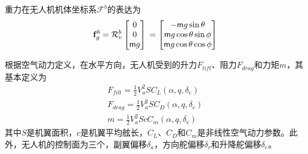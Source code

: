 重力在无人机机体坐标系$\mathcal{F}^b$的表达为
\begin{equation}
	\mathbf{f}_g^b =\mathcal{R}^b_v \begin{bmatrix}0  \\ 0  \\ \mathsf{m}g  \end{bmatrix} \\
	= \begin{bmatrix} -\mathsf{m} g \sin \theta  \\ \mathsf{m}g \cos \theta \sin \phi  \\ \mathsf{m}g \cos\theta \cos \phi  \end{bmatrix}
\end{equation}

根据空气动力定义，在水平方向，无人机受到的升力$F_{lift}$、阻力$F_{drag}$和力矩$m$，其基本定义为
\begin{align}
	F_{filt} = \frac{1}{2} V_a^2SC_L(\alpha, q, \delta_e) \\
	F_{drag} = \frac{1}{2} V_a^2SC_D(\alpha, q, \delta_e) \\
	m = \frac{1}{2} V_a^2ScC_m(\alpha, q, \delta_e)
\end{align}
其中$S$是机翼面积，$c$是机翼平均舷长，$C_L$、$C_D$和$C_m$是非线性空气动力参数。此外，无人机的控制面为三个，副翼偏移$\delta_a$，方向舵偏移$\delta_r$和升降舵偏移$\delta_e$。

